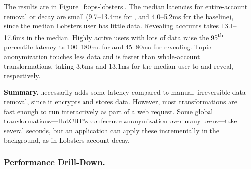 %
The results are in Figure~\ref{f:ops-lobsters}.
%
The median latencies for entire-account removal or decay are small (9.7--13.4ms
for \sys, and 4.0--5.2ms for the baseline), since the median Lobsters user has
little data. Revealing \xxed accounts takes 13.1--17.6ms in the median.
%
Highly active users with lots of data raise the 95\textsuperscript{th} percentile
latency to 100--180ms for \xxing and 45--80ms for revealing.
%
Topic anonymization touches less data and is faster than
whole-account transformations, taking 3.6ms and 13.1ms for the median user to
\xx and reveal, respectively.
%

\textbf{Summary.}
%
\sys necessarily adds some latency compared to manual, irreversible data
removal, since it encrypts and stores \xxed data.
%
However, most \xxing transformations are fast enough to run interactively as
part of a web request.
%
Some global \xxing transformations---\eg HotCRP's conference anonymization over
many users---take several seconds, but an application can apply these
incrementally in the background, as in Lobsters account decay.
%
%

\subsubsection{\sys Performance Drill-Down.}
\label{s:eval-additional}

